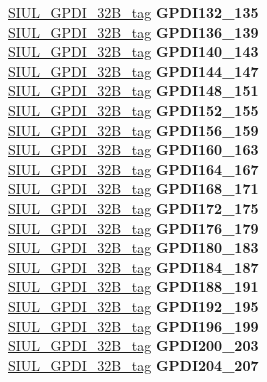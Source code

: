 \begin{DoxyCompactItemize}
\begin{tabbing}
\>\>\mbox{\hyperlink{unionSIUL__GPDI__32B__tag}{SIUL\_GPDI\_32B\_tag}} {\bfseries GPDI132\_135}\\
\>\>\mbox{\hyperlink{unionSIUL__GPDI__32B__tag}{SIUL\_GPDI\_32B\_tag}} {\bfseries GPDI136\_139}\\
\>\>\mbox{\hyperlink{unionSIUL__GPDI__32B__tag}{SIUL\_GPDI\_32B\_tag}} {\bfseries GPDI140\_143}\\
\>\>\mbox{\hyperlink{unionSIUL__GPDI__32B__tag}{SIUL\_GPDI\_32B\_tag}} {\bfseries GPDI144\_147}\\
\>\>\mbox{\hyperlink{unionSIUL__GPDI__32B__tag}{SIUL\_GPDI\_32B\_tag}} {\bfseries GPDI148\_151}\\
\>\>\mbox{\hyperlink{unionSIUL__GPDI__32B__tag}{SIUL\_GPDI\_32B\_tag}} {\bfseries GPDI152\_155}\\
\>\>\mbox{\hyperlink{unionSIUL__GPDI__32B__tag}{SIUL\_GPDI\_32B\_tag}} {\bfseries GPDI156\_159}\\
\>\>\mbox{\hyperlink{unionSIUL__GPDI__32B__tag}{SIUL\_GPDI\_32B\_tag}} {\bfseries GPDI160\_163}\\
\>\>\mbox{\hyperlink{unionSIUL__GPDI__32B__tag}{SIUL\_GPDI\_32B\_tag}} {\bfseries GPDI164\_167}\\
\>\>\mbox{\hyperlink{unionSIUL__GPDI__32B__tag}{SIUL\_GPDI\_32B\_tag}} {\bfseries GPDI168\_171}\\
\>\>\mbox{\hyperlink{unionSIUL__GPDI__32B__tag}{SIUL\_GPDI\_32B\_tag}} {\bfseries GPDI172\_175}\\
\>\>\mbox{\hyperlink{unionSIUL__GPDI__32B__tag}{SIUL\_GPDI\_32B\_tag}} {\bfseries GPDI176\_179}\\
\>\>\mbox{\hyperlink{unionSIUL__GPDI__32B__tag}{SIUL\_GPDI\_32B\_tag}} {\bfseries GPDI180\_183}\\
\>\>\mbox{\hyperlink{unionSIUL__GPDI__32B__tag}{SIUL\_GPDI\_32B\_tag}} {\bfseries GPDI184\_187}\\
\>\>\mbox{\hyperlink{unionSIUL__GPDI__32B__tag}{SIUL\_GPDI\_32B\_tag}} {\bfseries GPDI188\_191}\\
\>\>\mbox{\hyperlink{unionSIUL__GPDI__32B__tag}{SIUL\_GPDI\_32B\_tag}} {\bfseries GPDI192\_195}\\
\>\>\mbox{\hyperlink{unionSIUL__GPDI__32B__tag}{SIUL\_GPDI\_32B\_tag}} {\bfseries GPDI196\_199}\\
\>\>\mbox{\hyperlink{unionSIUL__GPDI__32B__tag}{SIUL\_GPDI\_32B\_tag}} {\bfseries GPDI200\_203}\\
\>\>\mbox{\hyperlink{unionSIUL__GPDI__32B__tag}{SIUL\_GPDI\_32B\_tag}} {\bfseries GPDI204\_207}\\

\end{tabbing}
\end{DoxyCompactItemize}
